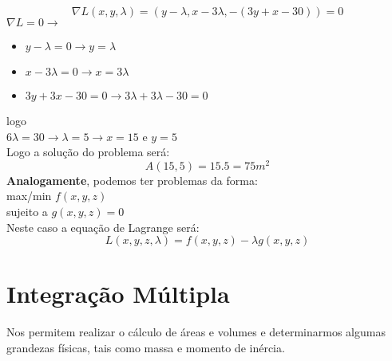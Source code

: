 \documentclass{article}
\begin{document}
		$$\nabla L(x,y,\lambda) = (y-\lambda,x-3\lambda,-(3y+x-30))=0$$
		$\nabla L = 0 \to $
		\begin{itemize}
			\item $y-\lambda =0 \to y= \lambda$
			\item $x-3\lambda = 0 \to x = 3\lambda$
			\item $3y+3x-30 = 0 \to 3\lambda+3\lambda-30 = 0$
		\end{itemize}
		logo\\
		$6\lambda =30 \to \lambda = 5 \to x = 15$ e $y=5$\\
		Logo a solução do problema será:
		$$A(15,5) = 15.5=75m^2$$
		\textbf{Analogamente}, podemos ter problemas da forma:\\
		max/min $f(x,y,z)$\\
		sujeito a $g(x,y,z)=0$\\
		Neste caso a equação de Lagrange será:
		$$L(x,y,z,\lambda) = f(x,y,z) - \lambda g(x,y,z)$$
	\section{Integração Múltipla}
		Nos permitem realizar o cálculo de áreas e volumes e determinarmos algumas grandezas físicas, tais como massa e momento de inércia.
\end{document}
